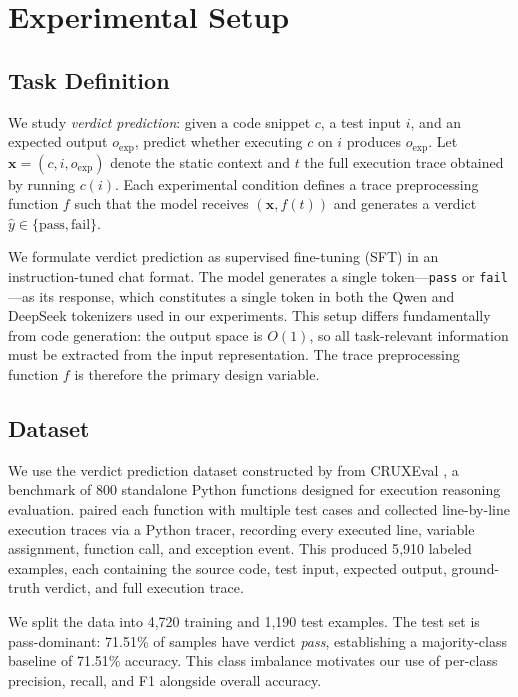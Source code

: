 \section{Experimental Setup}
\label{sec:setup}

\subsection{Task Definition}
\label{sec:task}

We study \emph{verdict prediction}: given a code snippet $c$, a test input $i$, and an expected output $o_{\text{exp}}$, predict whether executing $c$ on $i$ produces $o_{\text{exp}}$.
Let $\mathbf{x} = (c, i, o_{\text{exp}})$ denote the static context and $t$ the full execution trace obtained by running $c(i)$.
Each experimental condition defines a trace preprocessing function $f$ such that the model receives $(\mathbf{x}, f(t))$ and generates a verdict $\hat{y} \in \{\text{pass}, \text{fail}\}$.

We formulate verdict prediction as supervised fine-tuning (SFT) in an instruction-tuned chat format.
The model generates a single token---\texttt{pass} or \texttt{fail}---as its response, which constitutes a single token in both the Qwen and DeepSeek tokenizers used in our experiments.
This setup differs fundamentally from code generation: the output space is $O(1)$, so all task-relevant information must be extracted from the input representation.
The trace preprocessing function $f$ is therefore the primary design variable.

\subsection{Dataset}
\label{sec:dataset}

We use the verdict prediction dataset constructed by \cite{placeholder_WangEMNLP2025} from CRUXEval \citep{placeholder_GuICML2024}, a benchmark of 800 standalone Python functions designed for execution reasoning evaluation.
\cite{placeholder_WangEMNLP2025} paired each function with multiple test cases and collected line-by-line execution traces via a Python tracer, recording every executed line, variable assignment, function call, and exception event.
This produced 5{,}910 labeled examples, each containing the source code, test input, expected output, ground-truth verdict, and full execution trace.

We split the data into 4{,}720 training and 1{,}190 test examples.
The test set is pass-dominant: 71.51\% of samples have verdict \emph{pass}, establishing a majority-class baseline of 71.51\% accuracy.
This class imbalance motivates our use of per-class precision, recall, and F1 alongside overall accuracy.

